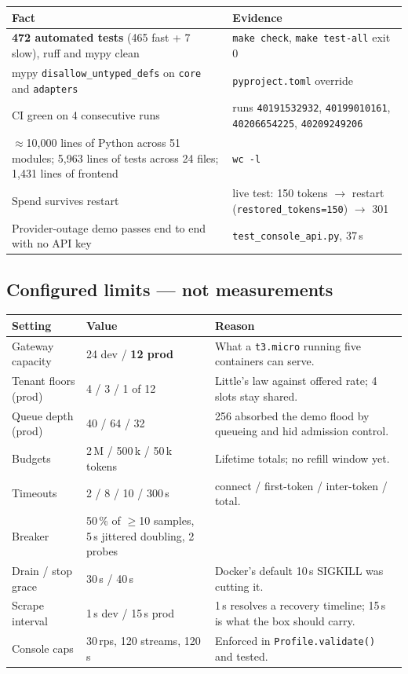 \documentclass[10pt,a4paper]{article}
\begin{document}
\begin{tabularx}{\textwidth}{@{}p{58mm}X@{}}
\toprule
\textbf{Fact} & \textbf{Evidence} \\
\midrule
\textbf{472 automated tests} (465 fast + 7 slow), ruff and mypy clean &
  \texttt{make check}, \texttt{make test-all} exit 0 \\
mypy \texttt{disallow\_untyped\_defs} on \texttt{core} and \texttt{adapters} &
  \texttt{pyproject.toml} override \\
CI green on 4 consecutive runs & runs \texttt{40191532932}, \texttt{40199010161},
  \texttt{40206654225}, \texttt{40209249206} \\
$\approx$10{,}000 lines of Python across 51 modules; 5{,}963 lines of tests
  across 24 files; 1{,}431 lines of frontend & \texttt{wc -l} \\
Spend survives restart & live test: 150 tokens $\rightarrow$ restart
  (\texttt{restored\_tokens=150}) $\rightarrow$ 301 \\
Provider-outage demo passes end to end with no API key &
  \texttt{test\_console\_api.py}, 37\,s \\
\bottomrule
\end{tabularx}

\subsection{Configured limits — not measurements}

\begin{tabularx}{\textwidth}{@{}p{46mm}p{30mm}X@{}}
\toprule
\textbf{Setting} & \textbf{Value} & \textbf{Reason} \\
\midrule
Gateway capacity & 24 dev / \textbf{12 prod} & What a \texttt{t3.micro}
  running five containers can serve. \\
Tenant floors (prod) & 4 / 3 / 1 of 12 & Little's law against offered rate;
  4 slots stay shared. \\
Queue depth (prod) & 40 / 64 / 32 & 256 absorbed the demo flood by queueing
  and hid admission control. \\
Budgets & 2\,M / 500\,k / 50\,k tokens & Lifetime totals; no refill window yet. \\
Timeouts & 2 / 8 / 10 / 300\,s & connect / first-token / inter-token / total. \\
Breaker & 50\,\% of $\geq$10 samples, 5\,s jittered doubling, 2 probes & \\
Drain / stop grace & 30\,s / 40\,s & Docker's default 10\,s SIGKILL was cutting it. \\
Scrape interval & 1\,s dev / 15\,s prod & 1\,s resolves a recovery timeline;
  15\,s is what the box should carry. \\
Console caps & 30\,rps, 120 streams, 120\,s & Enforced in
  \texttt{Profile.validate()} and tested. \\
\bottomrule
\end{tabularx}
\end{document}
